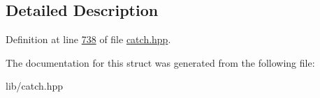 \subsection{Detailed Description}


Definition at line \mbox{\hyperlink{catch_8hpp_source_l00738}{738}} of file \mbox{\hyperlink{catch_8hpp_source}{catch.\+hpp}}.



The documentation for this struct was generated from the following file\+:\begin{DoxyCompactItemize}
\item 
lib/catch.\+hpp\end{DoxyCompactItemize}
